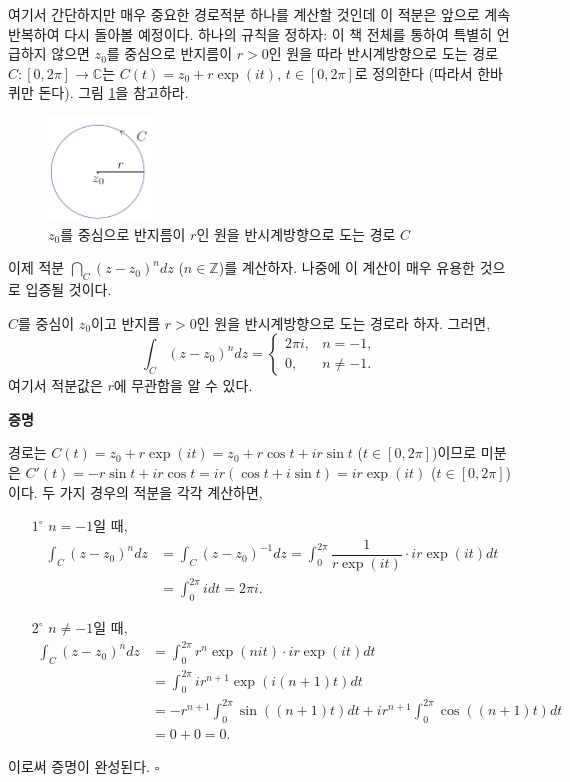 여기서 간단하지만 매우 중요한 경로적분 하나를 계산할 것인데
이 적분은 앞으로 계속 반복하여 다시 돌아볼 예정이다.
하나의 규칙을 정하자: 이 책 전체를 통하여 특별히 언급하지 않으면
$z_0$를 중심으로 반지름이 $r>0$인 원을 따라 반시계방향으로 도는 경로
$C: [0, 2\pi] \to \mathbb C$는 $C(t) = z_0 + r\exp(it)$, $t\in[0,2\pi]$로 정의한다
(따라서 한바퀴만 돈다). 그림 \ref{fig-3-8}을 참고하라.
\begin{figure}[!h]
\begin{center}
\includegraphics[width=0.25\textwidth]{./SaltChapter/figs/fig-3-8}
\end{center}
\caption{$z_0$를 중심으로 반지름이 $r$인 원을 반시계방향으로 도는 경로 $C$}
\label{fig-3-8}
\end{figure}

이제 적분 $\dint_C (z-z_0)^n dz$ ($n\in\mathbb Z$)를 계산하자.
나중에 이 계산이 매우 유용한 것으로 입증될 것이다.

\begin{salttheorem}{}{} \label{thm-3-1}
$C$를 중심이 $z_0$이고 반지름 $r>0$인 원을 반시계방향으로 도는 경로라 하자.
그러면,
\[
\int_C (z-z_0)^n dz = \begin{cases}
2\pi i, & n=-1,\\
0, & n\ne -1.
\end{cases}
\]
여기서 적분값은 $r$에 무관함을 알 수 있다.
\end{salttheorem}

{\bf 증명}

경로는 $C(t) = z_0 + r\exp(it) = z_0 + r\cos t + ir\sin t$ ($t\in[0,2\pi]$)이므로
미분은 $C'(t) = -r\sin t + ir\cos t = ir(\cos t + i\sin t) = ir\exp(it)$ ($t\in[0,2\pi]$)이다.
두 가지 경우의 적분을 각각 계산하면,

\begin{itemize}
\item[$1^\circ$] $n=-1$일 때,
\begin{align*}
\int_C (z-z_0)^n dz
&= \int_C (z-z_0)^{-1} dz = \int_0^{2\pi} \dfrac1{r\exp(it)}\cdot ir \exp(it)dt \\
&= \int_0^{2\pi} i dt  = 2\pi i.
\end{align*}
\item[$2^\circ$] $n\ne -1$일 때,
\begin{align*}
\int_C (z-z_0)^n dz
&= \int_0^{2\pi} r^n \exp(nit) \cdot ir \exp(it)dt \\
&= \int_0^{2\pi} ir^{n+1} \exp(i(n+1)t)dt \\
&= -r^{n+1} \int_0^{2\pi} \sin((n+1)t)dt + 
ir^{n+1} \int_0^{2\pi} \cos((n+1)t)dt \\
&= 0+0 = 0.
\end{align*}
\end{itemize}
이로써 증명이 완성된다.
\hfill $\square$

